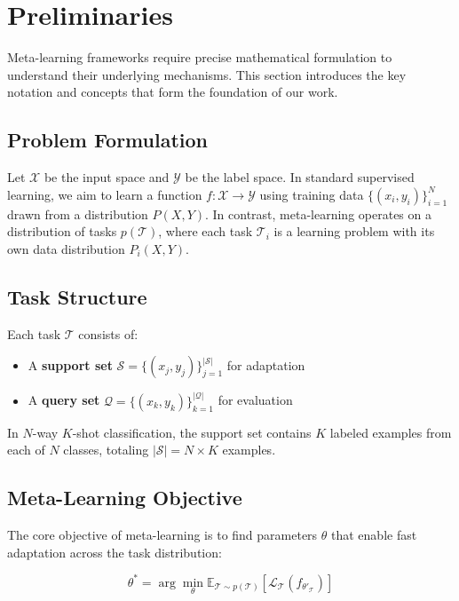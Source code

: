 \section{Preliminaries}

Meta-learning frameworks require precise mathematical formulation to understand their underlying mechanisms. This section introduces the key notation and concepts that form the foundation of our work.

\subsection{Problem Formulation}

Let $\mathcal{X}$ be the input space and $\mathcal{Y}$ be the label space. In standard supervised learning, we aim to learn a function $f: \mathcal{X} \rightarrow \mathcal{Y}$ using training data $\{(x_i, y_i)\}_{i=1}^N$ drawn from a distribution $P(X, Y)$. In contrast, meta-learning operates on a distribution of tasks $p(\mathcal{T})$, where each task $\mathcal{T}_i$ is a learning problem with its own data distribution $P_i(X, Y)$.

\subsection{Task Structure}

Each task $\mathcal{T}$ consists of:
\begin{itemize}
    \item A \textbf{support set} $\mathcal{S} = \{(x_j, y_j)\}_{j=1}^{|\mathcal{S}|}$ for adaptation
    \item A \textbf{query set} $\mathcal{Q} = \{(x_k, y_k)\}_{k=1}^{|\mathcal{Q}|}$ for evaluation
\end{itemize}

In $N$-way $K$-shot classification, the support set contains $K$ labeled examples from each of $N$ classes, totaling $|\mathcal{S}| = N \times K$ examples.

\subsection{Meta-Learning Objective}

The core objective of meta-learning is to find parameters $\theta$ that enable fast adaptation across the task distribution:

\begin{equation}
    \theta^* = \arg\min_\theta \mathbb{E}_{\mathcal{T} \sim p(\mathcal{T})} [\mathcal{L}_{\mathcal{T}}(f_{\theta'_\mathcal{T}})]
\end{equation}

